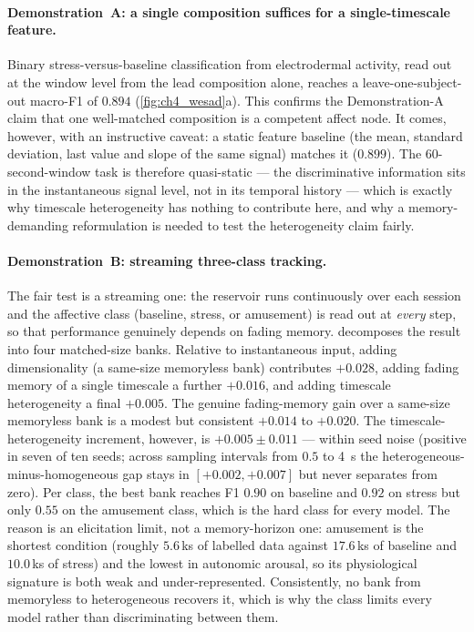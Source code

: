 \documentclass[12pt, twoside]{report}
\begin{document}
\paragraph{Demonstration~A: a single composition suffices for a single-timescale feature.} Binary stress-versus-baseline classification from electrodermal activity, read out at the window level from the lead composition alone, reaches a leave-one-subject-out macro-F1 of $0.894$ (\cref{fig:ch4_wesad}a). This confirms the Demonstration-A claim that one well-matched composition is a competent affect node. It comes, however, with an instructive caveat: a static feature baseline (the mean, standard deviation, last value and slope of the same signal) matches it ($0.899$). The 60-second-window task is therefore quasi-static --- the discriminative information sits in the instantaneous signal level, not in its temporal history --- which is exactly why timescale heterogeneity has nothing to contribute here, and why a memory-demanding reformulation is needed to test the heterogeneity claim fairly.

\paragraph{Demonstration~B: streaming three-class tracking.} The fair test is a streaming one: the reservoir runs continuously over each session and the affective class (baseline, stress, or amusement) is read out at \emph{every} step, so that performance genuinely depends on fading memory.  decomposes the result into four matched-size banks. Relative to instantaneous input, adding dimensionality (a same-size memoryless bank) contributes $+0.028$, adding fading memory of a single timescale a further $+0.016$, and adding timescale heterogeneity a final $+0.005$. The genuine fading-memory gain over a same-size memoryless bank is a modest but consistent $+0.014$ to $+0.020$. The timescale-heterogeneity increment, however, is $+0.005 \pm 0.011$ --- within seed noise (positive in seven of ten seeds; across sampling intervals from $0.5$ to \SI{4}{\second} the heterogeneous-minus-homogeneous gap stays in $[+0.002,+0.007]$ but never separates from zero). Per class, the best bank reaches F1 $0.90$ on baseline and $0.92$ on stress but only $0.55$ on the amusement class, which is the hard class for every model. The reason is an elicitation limit, not a memory-horizon one: amusement is the shortest \WESAD{} condition (roughly $5.6$\,ks of labelled data against $17.6$\,ks of baseline and $10.0$\,ks of stress) and the lowest in autonomic arousal, so its physiological signature is both weak and under-represented. Consistently, no bank from memoryless to heterogeneous recovers it, which is why the class limits every model rather than discriminating between them.
\end{document}
